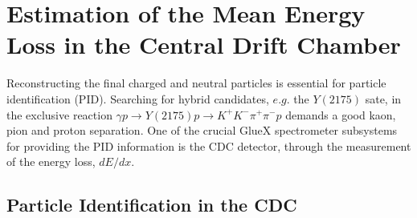 \chapter{Estimation of the Mean Energy Loss in the Central Drift Chamber}
\label{p.3}

Reconstructing the final charged and neutral particles is essential for particle identification (PID). Searching for hybrid candidates, $e.g.$ the $Y(2175)$ sate, in the exclusive reaction $\gamma p \rightarrow Y(2175) p \rightarrow K^{+}K^{-}\pi^{+}\pi^{-}p$ demands a good kaon, pion and proton separation. One of the crucial GlueX spectrometer subsystems for providing the PID information is the CDC detector, through the measurement of the energy loss, $dE/dx$.

\section{Particle Identification in the CDC}
\label{p.3.1}

